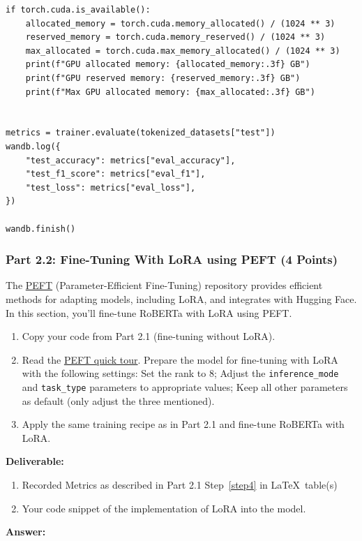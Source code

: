 \documentclass[11pt, oneside]{article}   	%
\begin{document}
\begin{verbatim}
if torch.cuda.is_available():
    allocated_memory = torch.cuda.memory_allocated() / (1024 ** 3)
    reserved_memory = torch.cuda.memory_reserved() / (1024 ** 3)
    max_allocated = torch.cuda.max_memory_allocated() / (1024 ** 3)
    print(f"GPU allocated memory: {allocated_memory:.3f} GB")
    print(f"GPU reserved memory: {reserved_memory:.3f} GB")
    print(f"Max GPU allocated memory: {max_allocated:.3f} GB")


metrics = trainer.evaluate(tokenized_datasets["test"])
wandb.log({
    "test_accuracy": metrics["eval_accuracy"],
    "test_f1_score": metrics["eval_f1"],
    "test_loss": metrics["eval_loss"],
})

wandb.finish()
\end{verbatim}

\newpage

\subsubsection*{Part 2.2: Fine-Tuning With LoRA using PEFT (4 Points)}
The \href{https://github.com/huggingface/peft}{PEFT} (Parameter-Efficient Fine-Tuning) repository provides efficient methods for adapting models, including LoRA, and integrates with Hugging Face. In this section, you’ll fine-tune RoBERTa with LoRA using PEFT.
\begin{enumerate}
    \item Copy your code from Part 2.1 (fine-tuning without LoRA).
    \item \label{step2} Read the \href{https://huggingface.co/docs/peft/quicktour}{PEFT quick tour}. Prepare the model for fine-tuning with LoRA with the following settings: Set the rank to 8; Adjust the \texttt{inference\_mode} and \texttt{task\_type} parameters to appropriate values; Keep all other parameters as default (only adjust the three mentioned).
   \item Apply the same training recipe as in Part 2.1 and fine-tune RoBERTa with LoRA.
\end{enumerate}


\textbf{Deliverable:}
\begin{enumerate}
    \item Recorded Metrics as described in Part 2.1 Step~\ref{step4} in \LaTeX~table(s)
    \item Your code snippet of the implementation of LoRA into the model.
\end{enumerate}

\textbf{Answer:} \\
\end{document}
